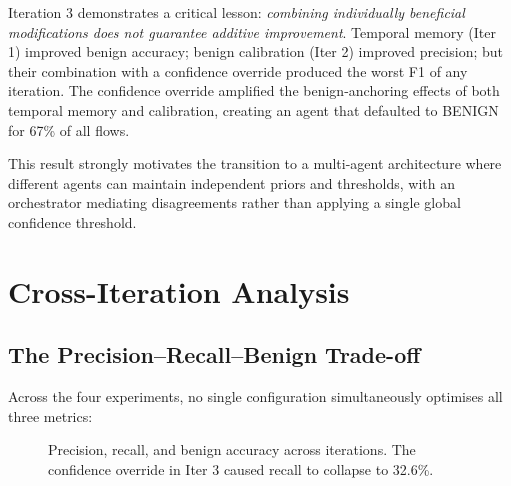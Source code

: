 \documentclass[12pt, a4paper, oneside]{report}
\begin{document}
Iteration 3 demonstrates a critical lesson: \emph{combining individually
beneficial modifications does not guarantee additive improvement}. Temporal
memory (Iter 1) improved benign accuracy; benign calibration (Iter 2) improved
precision; but their combination with a confidence override produced the worst
F1 of any iteration. The confidence override amplified the benign-anchoring
effects of both temporal memory and calibration, creating an agent that
defaulted to BENIGN for 67\% of all flows.

This result strongly motivates the transition to a multi-agent architecture
where different agents can maintain independent priors and thresholds, with an
orchestrator mediating disagreements rather than applying a single global
confidence threshold.


\section{Cross-Iteration Analysis}
\label{sec:cross-iteration}

\subsection{The Precision--Recall--Benign Trade-off}

Across the four experiments, no single configuration simultaneously optimises
all three metrics:

\begin{figure}[H]
\centering
{}
\caption{Precision, recall, and benign accuracy across iterations. The
  confidence override in Iter 3 caused recall to collapse to 32.6\%.}
\label{fig:tradeoff}
\end{figure}
\end{document}
